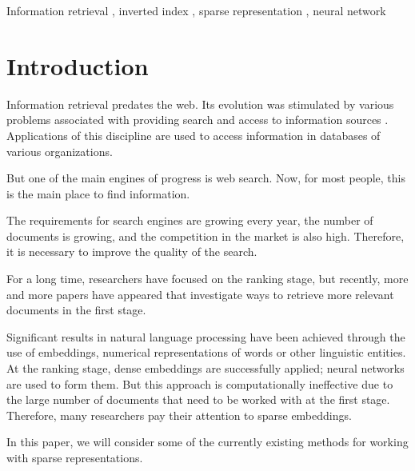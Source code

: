 \documentclass[
    twocolumn,
]{ceurart}
\begin{document}
    \begin{keywords}
        Information retrieval \sep
        inverted index \sep
        sparse representation \sep
        neural network
    \end{keywords}

    \maketitle


    \section{Introduction}

    Information retrieval predates the web.
    Its evolution was stimulated by various problems associated with providing search and access
    to information sources \cite{manning2008introduction}.
    Applications of this discipline are used to access information in databases of various
    organizations.

    But one of the main engines of progress is web search.
    Now, for most people, this is the main place to find information.

    The requirements for search engines are growing every year, the number of documents is growing,
    and the competition in the market is also high.
    Therefore, it is necessary to improve the quality of the search.

    For a long time, researchers have focused on the ranking stage, but recently, more and more
    papers have appeared that investigate ways to retrieve more relevant documents
    in the first stage.

    Significant results in natural language processing have been achieved through
    the use of embeddings, numerical representations of words or other linguistic entities.
    At the ranking stage, dense embeddings are successfully applied;
    neural networks are used to form them.
    But this approach is computationally ineffective due to the large number of documents that
    need to be worked with at the first stage.
    Therefore, many researchers pay their attention to sparse embeddings.

    In this paper, we will consider some of the currently existing methods for working with sparse
    representations.
\end{document}
